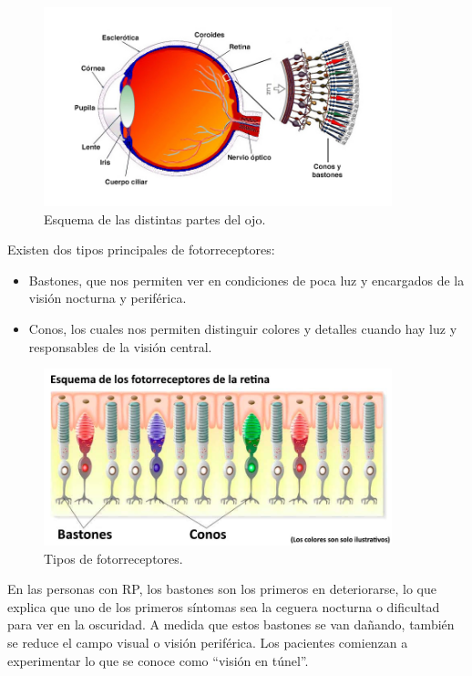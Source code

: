 \documentclass[11pt,spanish,listoffigures,listoftables]{tfgetsinf}
\begin{document}
\begin{figure}[H]
   \centering
   \includegraphics[width=0.9\textwidth]{retina.jpg}
   \caption{Esquema de las distintas partes del ojo.}
   \label{fig:etiqueta_opcional21}
\end{figure}

Existen dos tipos principales de fotorreceptores: 

\begin{itemize}
\item Bastones, que nos permiten ver en condiciones de poca luz y encargados de la visión nocturna y periférica. 
\item Conos, los cuales nos permiten distinguir colores y detalles cuando hay luz y responsables de la visión central. 
\end{itemize}

\begin{figure}[H]
   \centering
   \includegraphics[width=0.9\textwidth]{fotorreceptores.jpg}
   \caption{Tipos de fotorreceptores.}
   \label{fig:etiqueta_opcional22}
\end{figure}

En las personas con RP, los bastones son los primeros en deteriorarse, lo que explica que uno de los primeros síntomas sea la ceguera nocturna o dificultad para ver en la oscuridad. A medida que estos bastones se van dañando, también se reduce el campo visual o visión periférica. Los pacientes comienzan a experimentar lo que se conoce como “visión en túnel”.
\end{document}
